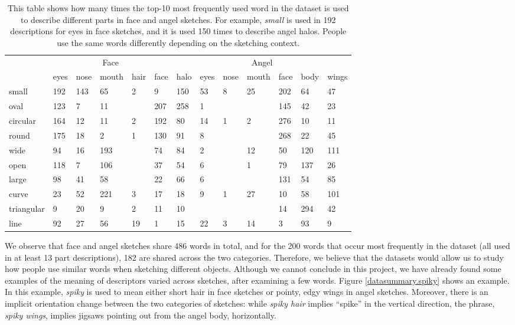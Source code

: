 \begin{table}[!htb]
\begin{minipage}{1\textwidth}
\begin{center}
{\small
\begin{tabular}{p{5em} | p{1.5em}p{1.5em}p{2em}p{1.5em}p{1.5em} | p{1.5em}p{1.5em}p{1.5em}p{2em}p{1.5em}p{1.5em}p{1.5em} }
\toprule
~ & \multicolumn{5}{c}{Face} & \multicolumn{7}{c}{Angel}\\
~ & eyes & nose & mouth & hair & face & halo & eyes & nose & mouth & face & body & wings  \\
\midrule
small & 192 & 143 & 65 & 2 & 9 & 150 & 53 & 8 & 25 & 202 & 64 & 47 \\
oval & 123 & 7 & 11 &   & 207 & 258 & 1 &   &   & 145 & 42 & 23 \\
circular & 164 & 12 & 11 & 2 & 192 & 80 & 14 & 1 & 2 & 276 & 10 & 11 \\
round & 175 & 18 & 2 & 1 & 130 & 91 & 8 &   &   & 268 & 22 & 45 \\
wide & 94 & 16 & 193 &   & 74 & 84 & 2 &   & 12 & 50 & 120 & 111 \\
open & 118 & 7 & 106 &   & 37 & 54 & 6 &   & 1 & 79 & 137 & 26 \\
large & 98 & 41 & 58 &   & 22 & 66 & 6 &   &   & 131 & 54 & 85 \\
curve & 23 & 52 & 221 & 3 & 17 & 18 & 9 & 1 & 27 & 10 & 58 & 101 \\
triangular & 9 & 20 & 9 & 2 & 11 & 10 &   &   &   & 14 & 294 & 42 \\
line & 92 & 27 & 56 & 19 & 1 & 15 & 22 & 3 & 14 & 3 & 93 & 9\\
\bottomrule
\end{tabular}}
\caption{This table shows how many times the top-10 most frequently used word in the dataset is used to describe different parts in face and angel sketches. For example, \textit{small} is used in 192 descriptions for eyes in face sketches, and it is used 150 times to describe angel halos. People use the same words differently depending on the sketching context.}
\label{table:parts_share_description}
\end{center}
\end{minipage}
\end{table}

We observe that face and angel sketches share 486 words in total, and for the 200 words that occur most frequently in the dataset (all used in at least 13 part descriptions), 182 are shared across the two categories. Therefore, we believe that the datasets would allow us to study how people use similar words when sketching different objects. Although we cannot conclude in this project, we have already found some examples of the meaning of descriptors varied across sketches, after examining a few words. Figure \ref{datasummary.spiky} shows an example. In this example, \textit{spiky} is used to mean either short hair in face sketches or pointy, edgy wings in angel sketches. Moreover, there is an implicit orientation change between the two categories of sketches: while \textit{spiky hair} implies ``spike'' in the vertical direction, the phrase, \textit{spiky wings}, implies jigsaws pointing out from the angel body, horizontally.   

